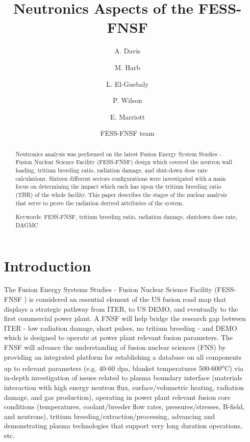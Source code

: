 \documentclass[12pt, letterpaper]{elsarticle}
\title{Neutronics Aspects of the FESS-FNSF}
\author[wisc]{A. Davis\corref{cor1}}
\author[wisc]{M. Harb}
\author[wisc]{L. El-Guebaly}
\author[wisc]{P. Wilson}
\author[wisc]{E. Marriott}
\author{FESS-FNSF team}
\begin{document}
 
\begin{abstract}
Neutronics analysis was performed on the latest Fusion Energy System Studies - Fusion Nuclear Science Facility (FESS-FNSF) design which covered the neutron wall loading, tritium breeding ratio, radiation damage, and shut-down dose rate calculations. Sixteen different sectors configurations were investigated with a main focus on determining the impact which each has upon the tritium breeding ratio (TBR) of the whole facility. This paper describes the stages of the nuclear analysis that serve to prove the radiation derived attributes of the system.

\vspace{5mm}
\noindent
Keywords: FESS-FNSF, tritium breeding ratio, radiation damage, shutdown dose rate, DAGMC
\end{abstract}

\begin{titlepage}
\maketitle
\end{titlepage}

\newpage
\listoffigures

\newpage
\section{Introduction} \label{Introduction}
The Fusion Energy Systems Studies - Fusion Nuclear Science Facility (FESS-FNSF \cite{ref_1}) is considered an essential element of the US fusion road map that displays a strategic pathway from ITER, to US DEMO, and eventually to the first commercial power plant. A FNSF will help bridge the research gap between ITER - low radiation damage, short pulses, no tritium breeding - and DEMO which is designed to operate at power plant relevant fusion parameters. The FNSF will advance the understanding of fusion nuclear sciences (FNS) by providing an integrated platform for establishing a database on all components up to relevant parameters (e.g. 40-60 dpa, blanket temperatures 500-600\textsuperscript{o}C) via in-depth investigation of issues related to plasma boundary interface (materials interaction with high energy neutron flux, surface/volumetric heating, radiation damage, and gas production), operating in power plant relevant fusion core conditions (temperatures, coolant/breeder flow rates, pressures/stresses, B-field, and neutrons), tritium breeding/extraction/processing, advancing and demonstrating plasma technologies that support very long duration operations, etc.\vspace{5mm}
\end{document}
